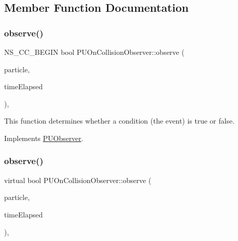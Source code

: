 \subsection{Member Function Documentation}
\mbox{\label{classPUOnCollisionObserver_ab3b3d75044d271697792ff7f6d7eff4e}} 
\subsubsection{\texorpdfstring{observe()}{observe()}\hspace{0.1cm}{\footnotesize\ttfamily [1/2]}}
{\footnotesize\ttfamily N\+S\+\_\+\+C\+C\+\_\+\+B\+E\+G\+IN bool P\+U\+On\+Collision\+Observer\+::observe (\begin{DoxyParamCaption}\item[{\hyperlink{structPUParticle3D}{P\+U\+Particle3D} $\ast$}]{particle,  }\item[{float}]{time\+Elapsed }\end{DoxyParamCaption})\hspace{0.3cm}{\ttfamily [override]}, {\ttfamily [virtual]}}

This function determines whether a condition (the event) is true or false. 

Implements \hyperlink{classPUObserver_a50f59cc3245e291b641463db5d3037f7}{P\+U\+Observer}.

\mbox{\label{classPUOnCollisionObserver_a59b536488e3a91560d8e3d730b860185}} 
\subsubsection{\texorpdfstring{observe()}{observe()}\hspace{0.1cm}{\footnotesize\ttfamily [2/2]}}
{\footnotesize\ttfamily virtual bool P\+U\+On\+Collision\+Observer\+::observe (\begin{DoxyParamCaption}\item[{\hyperlink{structPUParticle3D}{P\+U\+Particle3D} $\ast$}]{particle,  }\item[{float}]{time\+Elapsed }\end{DoxyParamCaption})\hspace{0.3cm}{\ttfamily [override]}, {\ttfamily [virtual]}}

